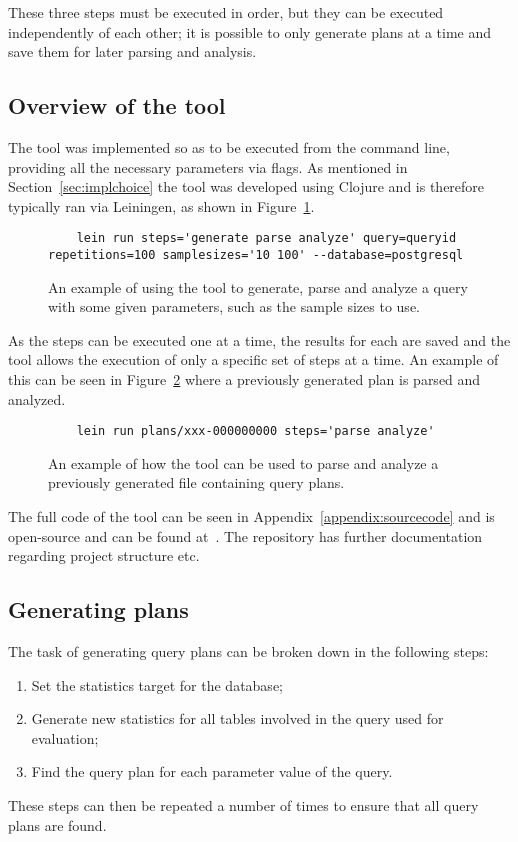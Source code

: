 These three steps must be executed in order, but they can be executed
independently of each other; it is possible to only generate plans at a time and
save them for later parsing and analysis.

\subsection{Overview of the tool}
The tool was implemented so as to be executed from the command line, providing
all the necessary parameters via flags. As mentioned in
Section~\ref{sec:implchoice} the tool was developed using Clojure and is
therefore typically ran via Leiningen, as shown in Figure~\ref{fig:cmd:runtool1}.

\begin{figure}[ht]
  \begin{verbatim}
    lein run steps='generate parse analyze' query=queryid repetitions=100 samplesizes='10 100' --database=postgresql
  \end{verbatim}
  \caption[Using the tool to generate, parse and analyze a query]{An example of
    using the tool to generate, parse and analyze a query with some given
    parameters, such as the sample sizes to use.}\label{fig:cmd:runtool1}
\end{figure}

As the steps can be executed one at a time, the results for each are saved and
the tool allows the execution of only a specific set of steps at a time. An
example of this can be seen in Figure~\ref{fig:cmd:runtool2} where a previously
generated plan is parsed and analyzed.

\begin{figure}[ht]
  \begin{verbatim}
    lein run plans/xxx-000000000 steps='parse analyze'
  \end{verbatim}
  \caption[Using the tool to parse and analyze a previously generated plan]{An
    example of how the tool can be used to parse and analyze a previously
    generated file containing query plans.}\label{fig:cmd:runtool2}
\end{figure}

The full code of the tool can be seen in Appendix~\ref{appendix:sourcecode} and is
open-source and can be found at~\cite{barksten_mbark_m}. The repository has
further documentation regarding project structure etc.

\subsection{Generating plans}\label{sec:generatingplans}
The task of generating query plans can be broken down in the following steps:
\begin{enumerate}
\item Set the statistics target for the database;
\item Generate new statistics for all tables involved in the query used for evaluation;
\item Find the query plan for each parameter value of the query.
\end{enumerate}
These steps can then be repeated a number of times to ensure that all query plans are
found.

